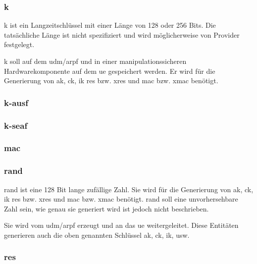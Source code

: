\subsubsection{\gls{k}}
\gls{k} ist ein Langzeitschl\"ussel mit einer L\"ange von 128 oder 256 Bits. %
Die tats\"achliche L\"ange ist nicht spezifiziert und wird m\"oglicherweise von Provider festgelegt. %

\gls{k} soll auf dem \gls{udm}/\gls{arpf} und in einer manipulationssicheren Hardwarekomponente auf dem \gls{ue} gespeichert werden.  %
Er wird f\"ur die Generierung von \gls{ak}, \gls{ck}, \gls{ik} \gls{res} bzw. \gls{xres} und \gls{mac} bzw. \gls{xmac} ben\"otigt. 

\subsubsection{\gls{k-ausf}}

\subsubsection{\gls{k-seaf}}

\subsubsection{\gls{mac}}

\subsubsection{\gls{rand}}
\gls{rand} ist eine 128 Bit lange zuf\"allige Zahl. %
Sie wird f\"ur die Generierung von \gls{ak}, \gls{ck}, \gls{ik} \gls{res} bzw. \gls{xres} und \gls{mac} bzw. \gls{xmac} ben\"otigt. 
\gls{rand} soll eine unvorhersehbare Zahl sein, wie genau sie generiert wird ist jedoch nicht beschrieben. %

Sie wird vom \gls{udm}/\gls{arpf} erzeugt und an das \gls{ue} weitergeleitet. Diese Entit\"aten generieren auch die oben genannten Schl\"ussel \gls{ak}, \gls{ck}, \gls{ik}, usw.

\subsubsection{\gls{res}}

